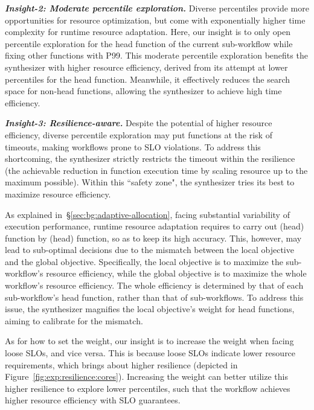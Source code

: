 \textbf{\textit{Insight-2: Moderate percentile exploration.}}
Diverse percentiles provide more opportunities for resource optimization, but come with exponentially higher time complexity for runtime resource adaptation.
Here, our insight is to only open percentile exploration for the head function of the current sub-workflow while fixing other functions with P99.
This moderate percentile exploration benefits the synthesizer with higher resource efficiency, derived from its attempt at lower percentiles for the head function.
Meanwhile, it effectively reduces the search space for non-head functions, allowing the synthesizer to achieve high time efficiency.

\textbf{\textit{Insight-3: Resilience-aware.}}
Despite the potential of higher resource efficiency, diverse percentile exploration may put functions at the risk of timeouts, making workflows prone to SLO violations.
To address this shortcoming, the synthesizer strictly restricts the timeout within the resilience (the achievable reduction in function execution time by scaling resource up to the maximum possible).
Within this ``safety zone", the synthesizer tries its best to maximize resource efficiency.

As explained in~\S\ref{sec:bg:adaptive-allocation}, facing substantial variability of execution performance, runtime resource adaptation requires to carry out (head) function by (head) function, so as to keep its high accuracy.
This, however, may lead to sub-optimal decisions due to the mismatch between the local objective and the global objective.
Specifically, the local objective is to maximize the sub-workflow's resource efficiency, while the global objective is to maximize the whole workflow's resource efficiency.
The whole efficiency is determined by that of each sub-workflow's head function, rather than that of sub-workflows.
To address this issue, the synthesizer magnifies the local objective's weight for head functions, aiming to calibrate for the mismatch.

As for how to set the weight, our insight is to increase the weight when facing loose SLOs, and vice versa.
This is because loose SLOs indicate lower resource requirements, which brings about higher resilience (depicted in Figure~\ref{fig:exp:resilience:cores}).
Increasing the weight can better utilize this higher resilience to explore lower percentiles, such that the workflow achieves higher resource efficiency with SLO guarantees.

